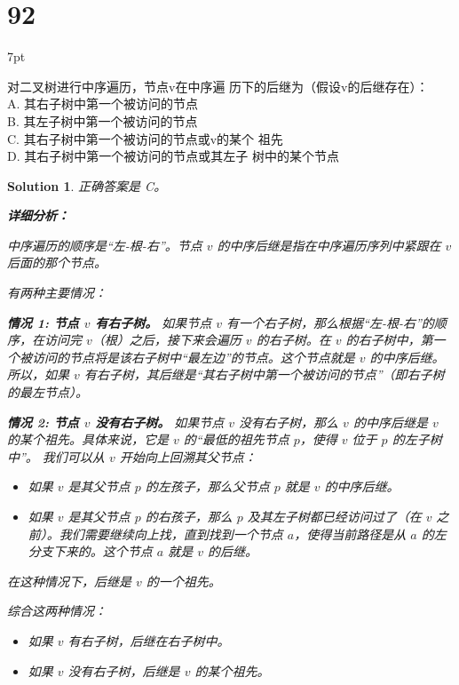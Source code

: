 \documentclass[UTF8]{report}
\newtheorem{solution}{Solution}
\theoremstyle{MyLineTheoremStyle} %
\theoremstyle{MyBlockTheoremStyle} %
\theoremstyle{MySubsubsectionStyle} %
\newenvironment{graybox}{%
        \def\FrameCommand{%
        \hspace{1pt}%
        {\color{gray}\small \vrule width 2pt}%
        {\color{graybox_color}\vrule width 4pt}%
        \colorbox{graybox_color}%
        }%
        \MakeFramed{\advance\hsize-\width\FrameRestore}%
        \noindent\hspace{-4.55pt}%
        \begin{adjustwidth}{}{7pt}%
        \vspace{2pt}\vspace{2pt}%
        }
        {%
        \vspace{2pt}\end{adjustwidth}\endMakeFramed%
        }
\begin{document}
\section*{92}
\begin{graybox}
对二叉树进行中序遍历，节点v在中序遍
历下的后继为（假设v的后继存在）： \\
A. 其右子树中第一个被访问的节点 \\
B. 其左子树中第一个被访问的节点 \\
C. 其右子树中第一个被访问的节点或v的某个
祖先 \\
D. 其右子树中第一个被访问的节点或其左子
树中的某个节点
\end{graybox}

\begin{solution}
正确答案是 C。

\textbf{详细分析：}

中序遍历的顺序是“左-根-右”。节点 $v$ 的中序后继是指在中序遍历序列中紧跟在 $v$ 后面的那个节点。

有两种主要情况：

\textbf{情况 1: 节点 $v$ 有右子树。}
如果节点 $v$ 有一个右子树，那么根据“左-根-右”的顺序，在访问完 $v$（根）之后，接下来会遍历 $v$ 的右子树。在 $v$ 的右子树中，第一个被访问的节点将是该右子树中“最左边”的节点。这个节点就是 $v$ 的中序后继。
所以，如果 $v$ 有右子树，其后继是“其右子树中第一个被访问的节点”（即右子树的最左节点）。

\textbf{情况 2: 节点 $v$ 没有右子树。}
如果节点 $v$ 没有右子树，那么 $v$ 的中序后继是 $v$ 的某个祖先。具体来说，它是 $v$ 的“最低的祖先节点 $p$，使得 $v$ 位于 $p$ 的左子树中”。
我们可以从 $v$ 开始向上回溯其父节点：
\begin{itemize}
    \item 如果 $v$ 是其父节点 $p$ 的左孩子，那么父节点 $p$ 就是 $v$ 的中序后继。
    \item 如果 $v$ 是其父节点 $p$ 的右孩子，那么 $p$ 及其左子树都已经访问过了（在 $v$ 之前）。我们需要继续向上找，直到找到一个节点 $a$，使得当前路径是从 $a$ 的左分支下来的。这个节点 $a$ 就是 $v$ 的后继。
\end{itemize}
在这种情况下，后继是 $v$ 的一个祖先。

综合这两种情况：
\begin{itemize}
    \item 如果 $v$ 有右子树，后继在右子树中。
    \item 如果 $v$ 没有右子树，后继是 $v$ 的某个祖先。
\end{itemize}


\end{solution}
\end{document}

